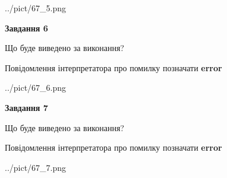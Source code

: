 \documentclass[10pt, ukrainian]{article}
\begin{document}
{\begin {large}
\begin{center}
	{../pict/67_5.png}
\end{center}
\newpage

{\begin {center}\textbf{Завдання 6}\end {center}}\par
Що буде виведено за виконання? \par
Повідомлення інтерпретатора про помилку позначати \textbf{error}

\begin{center}
	{../pict/67_6.png}
\end{center}
\newpage

{\begin {center}\textbf{Завдання 7}\end {center}}\par
Що буде виведено за виконання? \par
Повідомлення інтерпретатора про помилку позначати \textbf{error}

\begin{center}
	{../pict/67_7.png}
\end{center}
\newpage

\end {large}}
\end{document}
